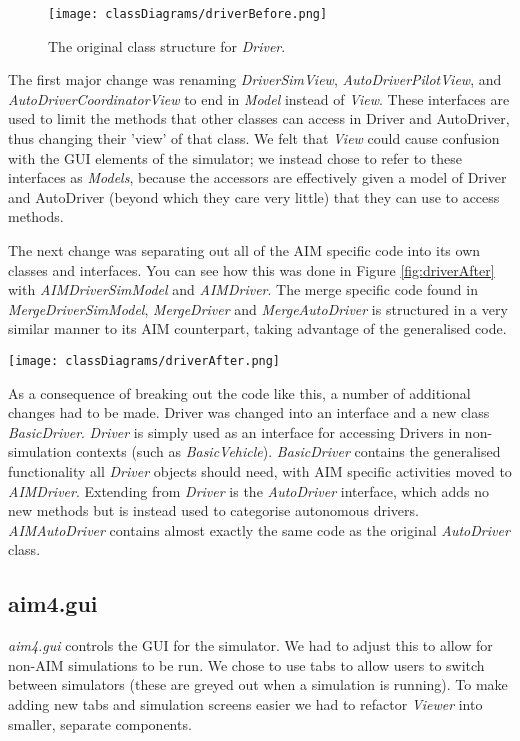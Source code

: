 \begin{appendices}
\begin{figure}[htb]
\texttt{[image: classDiagrams/driverBefore.png]}
\caption{The original class structure for \emph{Driver}.}
\label{fig:driverBefore}
\end{figure}

The first major change was renaming \emph{DriverSimView}, \emph{AutoDriverPilotView}, and \emph{AutoDriverCoordinatorView} to end in \emph{Model} instead of \emph{View}. These interfaces are used to limit the methods that other classes can access in Driver and AutoDriver, thus changing their 'view' of that class. We felt that \emph{View} could cause confusion with the GUI elements of the simulator; we instead chose to refer to these interfaces as \emph{Models}, because the accessors are effectively given a model of Driver and AutoDriver (beyond which they care very little) that they can use to access methods.

The next change was separating out all of the AIM specific code into its own classes and interfaces. You can see how this was done in Figure \ref{fig:driverAfter} with \emph{AIMDriverSimModel} and \emph{AIMDriver}. The merge specific code found in \emph{MergeDriverSimModel}, \emph{MergeDriver} and \emph{MergeAutoDriver} is structured in a very similar manner to its AIM counterpart, taking advantage of the generalised code.

\begin{sidewaysfigure}[p]
\texttt{[image: classDiagrams/driverAfter.png]}
\caption{The new class structure for \emph{Driver}.}
\label{fig:driverAfter}
\end{sidewaysfigure}

As a consequence of breaking out the code like this, a number of additional changes had to be made. Driver was changed into an interface and a new class \emph{BasicDriver}. \emph{Driver} is simply used as an interface for accessing Drivers in non-simulation contexts (such as \emph{BasicVehicle}). \emph{BasicDriver} contains the generalised functionality all \emph{Driver} objects should need, with AIM specific activities moved to \emph{AIMDriver}. Extending from \emph{Driver} is the \emph{AutoDriver} interface, which adds no new methods but is instead used to categorise autonomous drivers. \emph{AIMAutoDriver} contains almost exactly the same code as the original \emph{AutoDriver} class.

\FloatBarrier
\subsection{aim4.gui}
\label{subsec:aim4.gui}
\emph{aim4.gui} controls the GUI for the simulator. We had to adjust this to allow for non-AIM simulations to be run. We chose to use tabs to allow users to switch between simulators (these are greyed out when a simulation is running). To make adding new tabs and simulation screens easier we had to refactor \emph{Viewer} into smaller, separate components.


\end{appendices}
